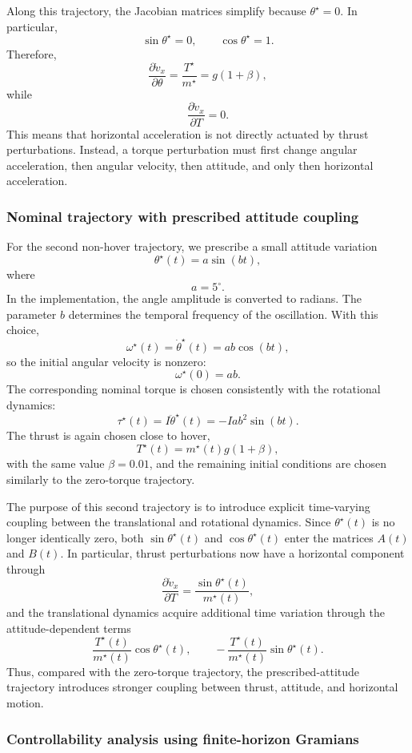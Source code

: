 Along this trajectory, the Jacobian matrices simplify because \(\theta^\star=0\). In particular,
\[
    \sin\theta^\star=0,
    \qquad
    \cos\theta^\star=1.
\]
Therefore,
\[
    \frac{\partial \dot v_x}{\partial \theta}
    =
    \frac{T^\star}{m^\star}
    =
    g(1+\beta),
\]
while
\[
    \frac{\partial \dot v_x}{\partial T}=0.
\]
This means that horizontal acceleration is not directly actuated by thrust perturbations. Instead, a torque perturbation must first change angular acceleration, then angular velocity, then attitude, and only then horizontal acceleration. 
\subsubsection{Nominal trajectory with prescribed attitude coupling}

For the second non-hover trajectory, we prescribe a small attitude variation
\[
    \theta^\star(t)=a\sin(bt),
\]
where
\[
    a = 5^\circ.
\]
In the implementation, the angle amplitude is converted to radians. The parameter \(b\) determines the temporal frequency of the oscillation. With this choice,
\[
    \omega^\star(t)=\dot\theta^\star(t)=ab\cos(bt),
\]
so the initial angular velocity is nonzero:
\[
    \omega^\star(0)=ab.
\]
The corresponding nominal torque is chosen consistently with the rotational dynamics:
\[
    \tau^\star(t)
    =
    I\ddot\theta^\star(t)
    =
    -Iab^2\sin(bt).
\]
The thrust is again chosen close to hover,
\[
    T^\star(t)=m^\star(t)g(1+\beta),
\]
with the same value \(\beta=0.01\), and the remaining initial conditions are chosen similarly to the zero-torque trajectory.

The purpose of this second trajectory is to introduce explicit time-varying coupling between the translational and rotational dynamics. Since \(\theta^\star(t)\) is no longer identically zero, both \(\sin\theta^\star(t)\) and \(\cos\theta^\star(t)\) enter the matrices \(A(t)\) and \(B(t)\). In particular, thrust perturbations now have a horizontal component through
\[
    \frac{\partial \dot v_x}{\partial T}
    =
    \frac{\sin\theta^\star(t)}{m^\star(t)},
\]
and the translational dynamics acquire additional time variation through the attitude-dependent terms
\[
    \frac{T^\star(t)}{m^\star(t)}\cos\theta^\star(t),
    \qquad
    -\frac{T^\star(t)}{m^\star(t)}\sin\theta^\star(t).
\]
Thus, compared with the zero-torque trajectory, the prescribed-attitude trajectory introduces stronger coupling between thrust, attitude, and horizontal motion.

\subsubsection{Controllability analysis using finite-horizon Gramians}

